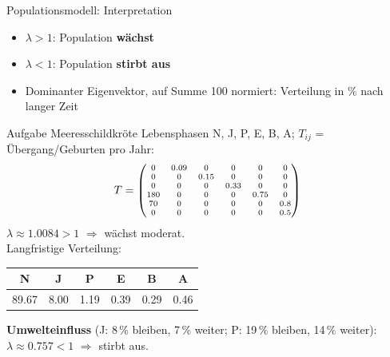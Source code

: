 \documentclass[a4paper, fontsize=7pt]{scrartcl}
\renewcommand*{\arraystretch}{1.5}  %
\begin{document}
\begin{mainbox}{Populationsmodell: Interpretation}
\begin{itemize}
    \item $\lambda > 1$: Population \textbf{wächst}
    \item $\lambda < 1$: Population \textbf{stirbt aus}
    \item Dominanter Eigenvektor, auf Summe 100 normiert: Verteilung in \% nach
          langer Zeit
\end{itemize}
\end{mainbox}

\begin{subbox}{Aufgabe Meeresschildkröte}
\renewcommand*{\arraystretch}{1.05}
\setlength{\arraycolsep}{2.5pt}
Lebensphasen N, J, P, E, B, A; $T_{ij}$ = Übergang/Geburten pro Jahr:
$$\scriptsize T = \begin{pmatrix}
0 & 0.09 & 0 & 0 & 0 & 0\\
0 & 0 & 0.15 & 0 & 0 & 0\\
0 & 0 & 0 & 0.33 & 0 & 0\\
180 & 0 & 0 & 0 & 0.75 & 0\\
70 & 0 & 0 & 0 & 0 & 0.8\\
0 & 0 & 0 & 0 & 0 & 0.5
\end{pmatrix}$$
$\lambda \approx 1.0084 > 1$ $\Rightarrow$ wächst moderat.\\
Langfristige Verteilung:
\begin{center}
\setlength{\tabcolsep}{3pt}
\begin{tabular}{cccccc}
N & J & P & E & B & A \\ \hline
89.67 & 8.00 & 1.19 & 0.39 & 0.29 & 0.46
\end{tabular}
\end{center}
\textbf{Umwelteinfluss} (J: 8\,\% bleiben, 7\,\% weiter; P: 19\,\% bleiben, 14\,\%
weiter): $\lambda \approx 0.757 < 1$ $\Rightarrow$ stirbt aus.
\end{subbox}
\end{document}
